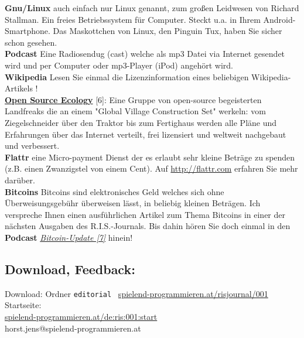 \textbf{Gnu/Linux} auch einfach nur Linux genannt, zum großen Leidwesen von Richard Stallman. Ein freies Betriebssystem für Computer. Steckt u.a. in Ihrem Android-Smartphone. Das Maskottchen von Linux, den Pinguin Tux, haben Sie sicher schon gesehen. \\

\textbf{Podcast} Eine Radiosendug (cast) welche als mp3 Datei via Internet gesendet wird und per Computer oder mp3-Player (iPod) angehört wird. \\

\textbf{Wikipedia} Lesen Sie einmal die Lizenzinformation eines beliebigen Wikipedia-Artikels ! \\

\href{http://opensourceecology.org/}{\textbf{Open Source Ecology}} [6]: Eine Gruppe von open-source begeisterten  Landfreaks die an einem "Global Village Construction Set" werkeln: vom Ziegelschneider über den Traktor bis zum Fertighaus werden alle Pläne und Erfahrungen über das Internet verteilt, frei lizensiert und weltweit nachgebaut und verbessert.\\

\textbf{Flattr} eine Micro-payment Dienst der es erlaubt sehr kleine Beträge  zu spenden (z.B. einen Zwanzigstel von einem Cent). Auf \url{http://flattr.com} erfahren Sie mehr darüber.\\

\textbf{Bitcoins} Bitcoins sind elektronisches Geld welches sich ohne Überweisungsgebühr überweisen lässt, in beliebig kleinen Beträgen. Ich verspreche Ihnen einen ausführlichen Artikel zum Thema Bitcoins in einer der nächsten Ausgaben des R.I.S.-Journals. Bis dahin hören Sie doch einmal in den \textbf{Podcast}  \href{http://www.bitcoinupdate.com/}{\textit{Bitcoin-Update [7]}} hinein!

\subsection*{Download, Feedback:}
\footnotesize{
Download: Ordner \texttt{editorial} \Mundus\ \href{http://spielend-programmieren.at/risjournal/001}{spielend-programmieren.at/risjournal/001}\\
Startseite:\\
\href{http://spielend-programmieren.at/de:ris:001:start}{spielend-programmieren.at/de:ris:001:start}\\ 
\Letter\: horst.jens@spielend-programmieren.at}
\normalsize


